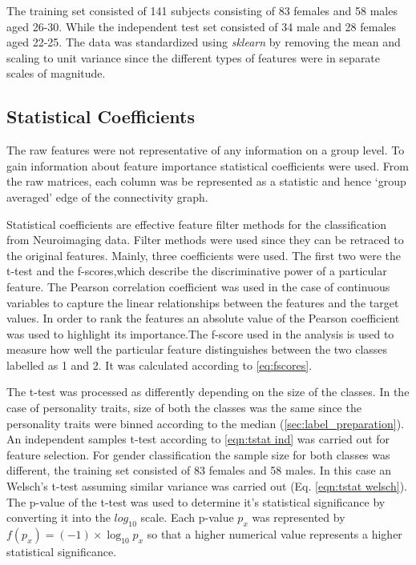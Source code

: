 \documentclass[msthesis.tex]{subfiles}
\begin{document}
The training set consisted of 141 subjects consisting of 83 females and 58 males aged 26-30. While the independent test set consisted of 34 male and 28 females aged 22-25. The data was standardized using \textit{sklearn} by removing the mean and scaling to unit variance since the different types of features were in separate scales of magnitude.

\subsection{Statistical Coefficients}
\label{subsub:statcoef}
The raw features were not representative of any information on a group level. To gain information about feature importance statistical coefficients were used. From the raw matrices, each column was be represented as a statistic and hence `group averaged' edge of the connectivity graph. 

Statistical coefficients are effective feature filter methods for the classification from Neuroimaging data. Filter methods were used since they can be retraced to the original features. Mainly, three coefficients were used. The first two were the t-test and the f-scores,which describe the discriminative power of a particular feature. The Pearson correlation coefficient was used in the case of continuous variables to capture the linear relationships between the features and the target values. In order to rank the features an absolute value of the Pearson coefficient was used to highlight its importance.The f-score used in the analysis is used to measure how well the particular feature distinguishes between the two classes labelled as 1 and 2. It was calculated according to \cref{eq:fscores}. 

The t-test was processed as differently depending on the size of the classes. In the case of personality traits, size of both the classes was the same since the personality traits were binned according to the median (\autoref{sec:label_preparation}). An independent samples t-test according to \cref{eqn:tstat ind} was carried out for feature selection. For gender classification the sample size for both classes was different, the training set consisted of 83 females and 58 males. In this case an Welsch's t-test assuming similar variance was carried out (Eq. \ref{eqn:tstat welsch}). The p-value of the t-test was used to determine it's statistical significance by converting it into the $log_{10}$ scale. Each p-value $p_x$ was represented by $ f(p_{x}) = (-1) \times \log_{10} p_x$ so that a higher numerical value represents a higher statistical significance. 
\end{document}

